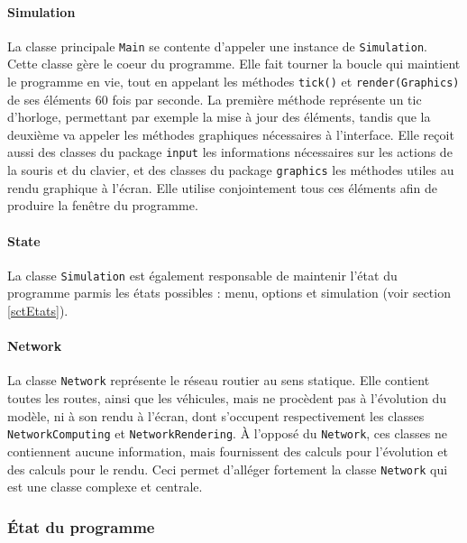 \documentclass[a4paper,11pt, titlepage]{extarticle}
\begin{document}
\paragraph{Simulation}

La classe principale \texttt{Main} se contente d'appeler une instance de \texttt{Simulation}. Cette classe gère le coeur du programme. Elle fait tourner la boucle qui maintient le programme en vie, tout en appelant les méthodes \texttt{tick()} et \texttt{render(Graphics)} de ses éléments 60 fois par seconde. La première méthode représente un tic d'horloge, permettant par exemple la mise à jour des éléments, tandis que la deuxième va appeler les méthodes graphiques nécessaires à l'interface. Elle reçoit aussi des classes du package \texttt{input} les informations nécessaires sur les actions de la souris et du clavier, et des classes du package \texttt{graphics} les méthodes utiles au rendu graphique à l'écran. Elle utilise conjointement tous ces éléments afin de produire la fenêtre du programme.

\paragraph{State}

La classe \texttt{Simulation} est également responsable de maintenir l'état du programme parmis les états possibles : menu, options et simulation (voir section \ref{sctEtats}).

\paragraph{Network}

La classe \texttt{Network} représente le réseau routier au sens statique. Elle contient toutes les routes, ainsi que les véhicules, mais ne procèdent pas à l'évolution du modèle, ni à son rendu à l'écran, dont s'occupent respectivement les classes \texttt{NetworkComputing} et \texttt{NetworkRendering}. À l'opposé du \texttt{Network}, ces classes ne contiennent aucune information, mais fournissent des calculs pour l'évolution et des calculs pour le rendu. Ceci permet d'alléger fortement la classe \texttt{Network} qui est une classe complexe et centrale.

\subsubsection{\label{sctEtats}État du programme}
\end{document}
